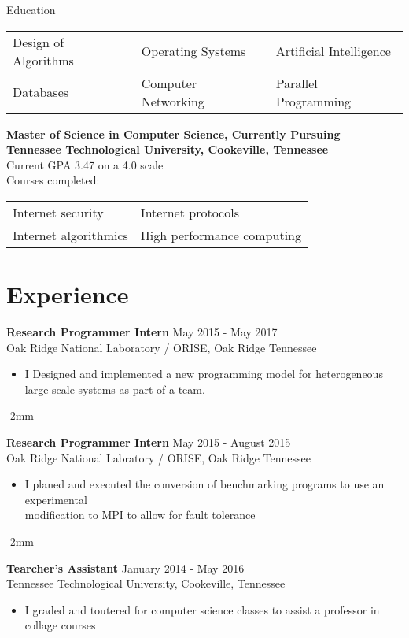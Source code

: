 \documentclass[10pt]{res}
\newcommand{\job}[5]{
    {\bf #1} \hfill #2 \\
    #3 #4
    #5
}
\begin{document}
\begin{resume}
\begin{section}{Education}
    \vspace{-0.15in}
    \begin{tabularx}{\textwidth}{l l l}
        Design of Algorithms & Operating Systems & Artificial Intelligence \\
        Databases & Computer Networking & Parallel Programming \\
    \end{tabularx}

    {\bf Master of Science in Computer Science, Currently Pursuing\\
    Tennessee Technological University, Cookeville, Tennessee} \\
    Current GPA 3.47 on a 4.0 scale \\
    Courses completed:

    \vspace{-0.15in}
    \begin{tabularx}{\textwidth}{l l}
        Internet security & Internet protocols \\
        Internet algorithmics & High performance computing \\
    \end{tabularx}
\end{section}
%
%
\section{Experience}
\job{Research Programmer Intern} {May 2015 - May 2017} {Oak Ridge National Laboratory / ORISE, Oak Ridge Tennessee}
{
\begin{itemize} \itemsep -2pt  %
         \item {I Designed and implemented a new programming model for 
             heterogeneous large scale systems as part of a team.}
\end{itemize}
}
\vspace{-2mm}
\job{Research Programmer Intern} {May 2015 - August 2015}
{Oak Ridge National Labratory / ORISE, Oak Ridge Tennessee}
{
\begin{itemize} \itemsep -2pt  %
         \item {I planed and executed the conversion of benchmarking 
             programs to use an experimental\\ 
             modification to MPI to allow for fault tolerance}
\end{itemize}
}

\vspace{-2mm}
\job{Tearcher's Assistant} {January 2014 - May 2016}
{Tennessee Technological University, Cookeville, Tennessee}
{
\begin{itemize} \itemsep -2pt  %
         \item {I graded and toutered for computer science classes to assist a 
                professor in collage courses}
\end{itemize}
}


\end{resume}
\end{document}
